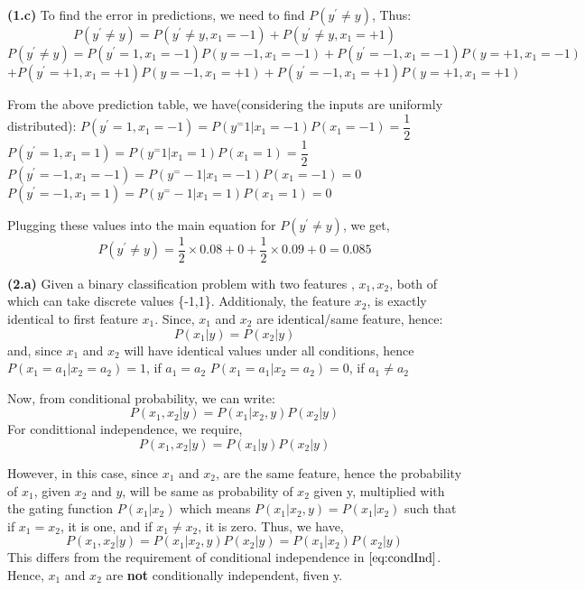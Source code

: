 \documentclass{article}
\renewcommand\part[1]{\vspace{.10in}\textbf{(#1)}}
\begin{document}
  
 \part{1.c} To find the error in predictions, we need to find $P(y^\prime \neq y)$, Thus:
  \[P(y^\prime \neq y) = P(y^\prime \neq y, x_1 = -1) + P(y^\prime \neq y, x_1 = +1)\]
  $P(y^\prime \neq y) = P(y^\prime = 1,x_1 = -1)P(y=-1,x_1=-1) + P(y^\prime =-1,x_1 = -1)P(y=+1,x_1=-1)$ \newline
	$ + P(y^\prime = +1, x_1 = +1)P(y=-1, x_1 = +1) + P(y^\prime = -1, x_1 = +1)P(y=+1, x_1 = +1)$ \newline

	From the above prediction table, we have(considering the inputs are uniformly distributed):
	$P(y^\prime=1,x_1=-1) = P(y^=1|x_1=-1)P(x_1=-1) = \dfrac{1}{2}$
	$P(y^\prime=1,x_1=1) = P(y^=1|x_1=1)P(x_1=1) = \dfrac{1}{2}$
	$P(y^\prime=-1,x_1=-1) = P(y^=-1|x_1=-1)P(x_1=-1) = 0$
	$P(y^\prime=-1,x_1=1) = P(y^=-1|x_1=1)P(x_1=1) = 0$

	Plugging these values into the main equation for $P(y^\prime \neq y)$, we get,
	\[P(y^\prime \neq y) = \dfrac{1}{2}\times 0.08 + 0 + \dfrac{1}{2}\times 0.09 + 0 = 0.085\]

 \part{2.a} Given a binary classification problem with two features , $x_1,x_2$, both of which can take discrete values \{-1,1\}. Additionaly, the feature $x_2$, is exactly identical to first feature $x_1$. \newline
	Since, $x_1$ and $x_2$ are identical/same feature, hence:
	\[P(x_1 |y) = P(x_2|y)\]
	and, since $x_1$ and $x_2$ will have identical values under all conditions, hence\newline
	$P(x_1 = a_1 | x_2 = a_2) = 1$, if $a_1 = a_2$ \newline
	$P(x_1 = a_1 | x_2 = a_2) = 0$, if $a_1 \neq a_2$ \newline

	Now, from conditional probability, we can write:
	\[P(x_1,x_2 | y) = P(x_1 | x_2,y) P(x_2 | y)\]
	For condittional independence, we require,
	\begin{equation}
		P(x_1,x_2 | y) = P(x_1 | y) P(x_2|y)
		\label{eq:condInd}
	\end{equation}

	However, in this case, since $x_1$ and $x_2$, are the same feature, hence the probability of $x_1$, given $x_2$ and $y$, will be same as probability of $x_2$ given y, multiplied with the gating function $P(x_1 | x_2)$ which means $P(x_1 | x_2,y) = P(x_1 | x_2)$ such that if $x_1=x_2$, it is one, and if $x_1 \neq x_2$, it is zero. Thus, we have,
	\[P(x_1,x_2 | y) = P(x_1 | x_2,y) P(x_2 | y) = P(x_1 | x_2) P(x_2|y)\]
	This differs from the requirement of conditional independence in $\eqref{eq:condInd}$. Hence, $x_1$ and $x_2$ are \textbf {not} conditionally independent, fiven y. 
\end{document}
